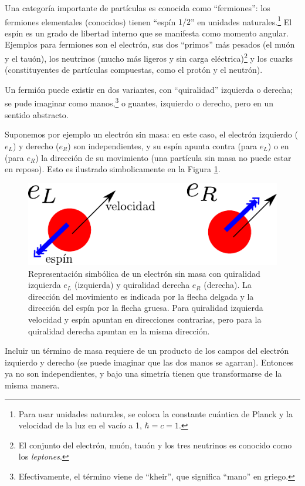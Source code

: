 Una categor\'ia importante de part\'iculas es conocida como
``fermiones'': los fermiones elementales (conocidos) tienen
``esp\'in $1/2 $'' en unidades naturales.\footnote{Para
usar unidades naturales, se coloca la constante
cu\'antica de Planck y la velocidad de la luz en el vac\'io a 1,
$\hbar = c =1$.}
El esp\'in es un grado de libertad interno que se manifesta como
momento angular. Ejemplos para fermiones son el electr\'on, sus dos
``primos'' m\'as pesados (el mu\'on y el tau\'on), los neutrinos (mucho
m\'as ligeros y sin carga el\'ectrica)\footnote{El conjunto del
electr\'on, mu\'on, tau\'on y los tres neutrinos es conocido como
los {\em leptones}.}
y los cuarks (constituyentes
de part\'iculas compuestas, como el prot\'on y el neutr\'on).

Un fermi\'on puede existir en dos variantes, con ``quiralidad''
izquierda o derecha; se pude imaginar como manos,\footnote{Efectivamente,
el t\'ermino viene de ``kheir'', que significa ``mano'' en griego.} 
o guantes, izquierdo o derecho, pero en un sentido abstracto.

Suponemos por ejemplo un electr\'{o}n sin masa: en este caso,
el electr\'on izquierdo ($e_L$) y derecho ($e_R$) son independientes,
y su esp\'in apunta contra (para $e_L$) o en (para $e_R$) la
direcci\'on de su movimiento (una part\'icula sin masa no
puede estar en reposo). Esto es ilustrado simbolicamente en
la Figura \ref{electron}.

\begin{figure}
\centering
\includegraphics[scale=1]{images/quiral.pdf}
\caption{Representaci\' on simb\'olica de un electr\'on sin masa con
quiralidad izquierda $e_L$ (izquierda) y quiralidad derecha $e_R$
(derecha). La direcci\'on del movimiento es
indicada por la flecha delgada y la direcci\'on del esp\'in
por la flecha gruesa. Para quiralidad izquierda velocidad y
esp\'in apuntan en direcciones contrarias, pero para la quiralidad
derecha apuntan en la misma direcci\'on.}
\label{electron}
\end{figure}
Incluir un t\'ermino de masa requiere de un producto de los campos
del electr\'on izquierdo y derecho (se puede imaginar que las dos
manos se agarran). Entonces ya no son independientes, y bajo una
simetr\'ia tienen que transformarse de la misma manera.

